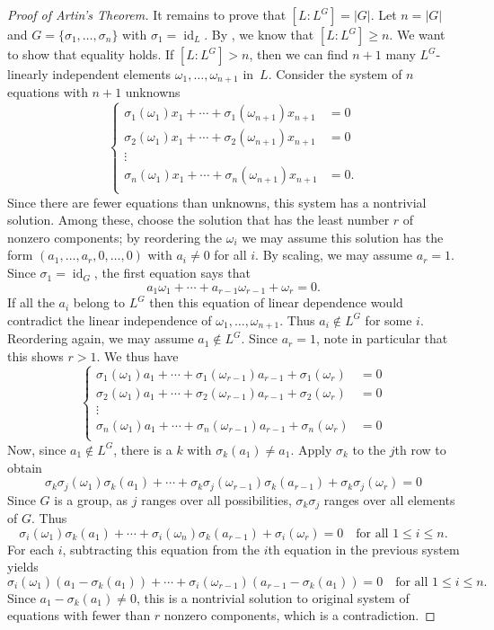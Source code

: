 \documentclass[12pt]{report}
\numberwithin{equation}{section}
\numberwithin{theorem}{chapter}
\theoremstyle{definition}
\newtheorem*{basic properties}{Basic Properties}
\newtheorem*{Important Remark}{Important Remark}
\DeclareMathOperator{\id}{id}
\begin{document}
\begin{proof}[Proof of Artin's Theorem]
It remains to prove that $[L: L^G] = |G|$. Let $n = |G|$ and $G=\{\sigma_1, \ldots, \sigma_n\}$ with $\sigma_1 = \id_L$.
By , we know that $[L: L^G] \geqslant n$. We want to show that equality holds.
If $[L: L^G] > n$, then we can find $n+1$ many $L^G$-linearly independent elements $\omega_1, \ldots, \omega_{n+1}$ in~$L$. Consider the system of $n$ equations with $n+1$ unknowns
$$\left\lbrace\begin{array}{cl}
\sigma_1(\omega_1) x_1 + \cdots + \sigma_1(\omega_{n+1}) x_{n+1} & = 0 \\
\sigma_2(\omega_1) x_1 + \cdots + \sigma_2(\omega_{n+1}) x_{n+1} & = 0 \\
\vdots \\
\sigma_n(\omega_1) x_1 + \cdots + \sigma_n(\omega_{n+1}) x_{n+1} & = 0. \\
\end{array}\right.$$
Since there are fewer equations than unknowns, this system has a nontrivial solution. Among these, choose the solution that has the least number $r$ of nonzero components; by reordering the $\omega_i$ we may assume this solution has the form $(a_1, \ldots, a_r, 0, \ldots, 0)$ with $a_i \neq 0$ for all $i$. By scaling, we may assume $a_r = 1$. Since $\sigma_1 = \id_G$, the first equation says that
$$a_1 \omega_1 + \cdots + a_{r-1} \omega_{r-1} + \omega_r = 0.$$
If all the $a_i$ belong to $L^G$ then this equation of linear dependence would contradict the linear independence of $\omega_1, \ldots, \omega_{n+1}$. Thus $a_i \notin L^G$ for some $i$. Reordering again, we may assume $a_1 \notin L^G$.
Since $a_r =1$, note in particular that this shows $r > 1$.
We thus have
$$\left\lbrace\begin{array}{cl}
\sigma_1(\omega_1) a_1 + \cdots + \sigma_1(\omega_{r-1}) a_{r-1} + \sigma_1(\omega_r)  & = 0 \\
\sigma_2(\omega_1) a_1 + \cdots + \sigma_2(\omega_{r-1}) a_{r-1} + \sigma_2(\omega_r)  & = 0 \\
\vdots \\
\sigma_n(\omega_1) a_1 + \cdots + \sigma_n(\omega_{r-1}) a_{r-1} + \sigma_n(\omega_r)  & = 0 \\
\end{array}\right.$$
Now, since $a_1 \notin L^G$, there is a $k$ with $\sigma_k(a_1) \neq a_1$. Apply $\sigma_k$ to the $j$th row to obtain
$$
\sigma_k \sigma_j(\omega_1) \sigma_k(a_1) + \cdots + \sigma_k \sigma_j(\omega_{r-1})\sigma_k(a_{r-1})
+ \sigma_k \sigma_j(\omega_{r})  = 0
$$
Since $G$ is a group, as $j$ ranges over all possibilities, $\sigma_k \sigma_j$ ranges over all
elements of $G$. Thus
$$
\sigma_i(\omega_1) \sigma_k(a_1) + \cdots + \sigma_i(\omega_{n})\sigma_k(a_{r-1})
+ \sigma_i(\omega_{r})  = 0 \quad \textrm{for all } 1 \leqslant i \leqslant n.$$
For each $i$, subtracting this equation from the $i$th equation in the previous system yields
$$\sigma_i(\omega_1) (a_1 -  \sigma_k(a_1)) + \cdots + \sigma_i(\omega_{r-1})(a_{r-1} - \sigma_k(a_1) ) = 0 \quad \textrm{for all } 1 \leqslant i\leqslant n.$$
Since $a_1 - \sigma_k(a_1) \neq 0$, this is a nontrivial solution to original system of equations with fewer than $r$ nonzero components, which is a contradiction. 
\end{proof}






\printindex

%
%
\end{document}
